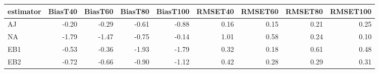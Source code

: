 \begin{table}[ht]
\centering
\begin{tabular}{lrrrrrrrr}
  \toprule
estimator & BiasT40 & BiasT60 & BiasT80 & BiasT100 & RMSET40 & RMSET60 & RMSET80 & RMSET100 \\ 
  \midrule
AJ & -0.20 & -0.29 & -0.61 & -0.88 & 0.16 & 0.15 & 0.21 & 0.25 \\ 
  NA & -1.79 & -1.47 & -0.75 & -0.14 & 1.01 & 0.58 & 0.24 & 0.10 \\ 
  EB1 & -0.53 & -0.36 & -1.93 & -1.79 & 0.32 & 0.18 & 0.61 & 0.48 \\ 
  EB2 & -0.72 & -0.66 & -0.90 & -1.12 & 0.42 & 0.28 & 0.29 & 0.31 \\ 
   \bottomrule
\end{tabular}
\end{table}
